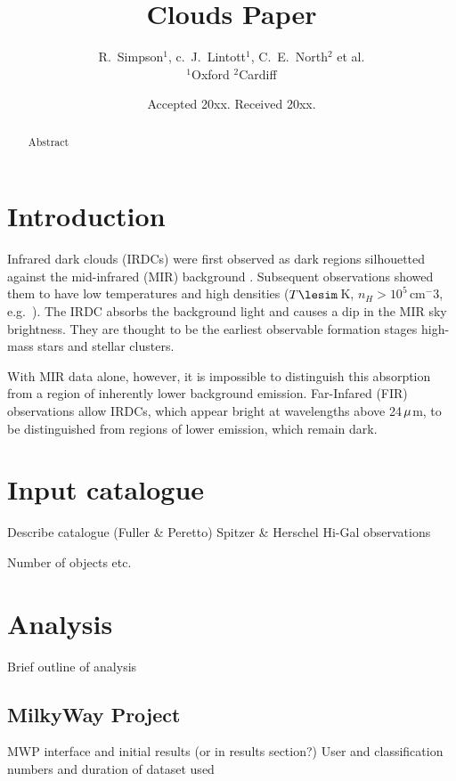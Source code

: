 \documentclass[a4,useAMS,usenatbib]{mn2e}
\title{Clouds Paper}
\author[The world]{R.~Simpson$^1$, c.~J.~Lintott$^1$, C.~E.~North$^2$ et al.
\\
$^1$Oxford
$^2$Cardiff
}
\def\mic{$\umu$m}
\begin{document}
\date{Accepted 20xx. Received 20xx.}

\pagerange{\pageref{firstpage}--\pageref{lastpage}} 

\maketitle

\label{firstpage}

\begin{abstract}
Abstract
\end{abstract}

\section{Introduction}
Infrared dark clouds (IRDCs) were first observed as dark regions
silhouetted against the mid-infrared (MIR) background
\citep{Wilcock2011}. Subsequent observations showed them to have low
temperatures and high densities ($T\lesim$\,K, $n_H > 10^5$\,cm$^-3$,
e.g.~\citet{Egan98,Carey98,HennebellePerault02}). The IRDC absorbs the
background light and causes a dip in the MIR sky brightness. They are
thought to be the earliest observable formation stages high-mass stars
and stellar clusters.

With MIR data alone, however, it is impossible to distinguish this
absorption from a region of inherently lower background
emission. Far-Infared (FIR) observations allow IRDCs, which appear
bright at wavelengths above 24\,\mic, to be distinguished from regions
of lower emission, which remain dark.


\section{Input catalogue}
Describe catalogue (Fuller \& Peretto)
Spitzer \& Herschel Hi-Gal observations

Number of objects etc.

\section{Analysis}
Brief outline of analysis

\subsection{MilkyWay Project}
MWP interface and initial results (or in results section?)
User and classification numbers and duration of dataset used
\end{document}

